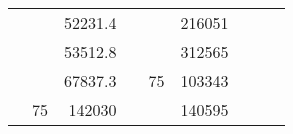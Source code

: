 \begin{table}[]
\begin{tabular}{|ccrccrccc}
\multicolumn{1}{|c|}{\cellcolor[HTML]{FFFFC7}}                                & \multicolumn{1}{c|}{\cellcolor[HTML]{DAE8FC}}                      & \multicolumn{1}{r|}{\cellcolor[HTML]{DAE8FC}52231.4}   & \multicolumn{1}{c|}{\cellcolor[HTML]{FFFFC7}}                                & \multicolumn{1}{c|}{\cellcolor[HTML]{DAE8FC}}                       & \multicolumn{1}{r|}{\cellcolor[HTML]{DDFDFF}216051}    &                                                                              &                                                                    &                                                        \\ \cline{3-3} \cline{6-6}
\multicolumn{1}{|c|}{\cellcolor[HTML]{FFFFC7}}                                & \multicolumn{1}{c|}{\cellcolor[HTML]{DAE8FC}}                      & \multicolumn{1}{r|}{\cellcolor[HTML]{DDFDFF}53512.8}   & \multicolumn{1}{c|}{\cellcolor[HTML]{FFFFC7}}                                & \multicolumn{1}{c|}{\cellcolor[HTML]{DAE8FC}}                       & \multicolumn{1}{r|}{\cellcolor[HTML]{DAE8FC}312565}    &                                                                              &                                                                    &                                                        \\ \cline{3-3} \cline{6-6}
\multicolumn{1}{|c|}{\cellcolor[HTML]{FFFFC7}}                                & \multicolumn{1}{c|}{\cellcolor[HTML]{DAE8FC}}                      & \multicolumn{1}{r|}{\cellcolor[HTML]{DAE8FC}67837.3}   & \multicolumn{1}{c|}{\cellcolor[HTML]{FFFFC7}}                                & \multicolumn{1}{c|}{\multirow{-10}{*}{\cellcolor[HTML]{DAE8FC}75}}  & \multicolumn{1}{r|}{\cellcolor[HTML]{DDFDFF}103343}    &                                                                              &                                                                    &                                                        \\ \cline{3-3} \cline{5-6}
\multicolumn{1}{|c|}{\cellcolor[HTML]{FFFFC7}}                                & \multicolumn{1}{c|}{\multirow{-10}{*}{\cellcolor[HTML]{DAE8FC}75}} & \multicolumn{1}{r|}{\cellcolor[HTML]{DDFDFF}142030}    & \multicolumn{1}{c|}{\cellcolor[HTML]{FFFFC7}}                                & \multicolumn{1}{c|}{\cellcolor[HTML]{DDFDFF}}                       & \multicolumn{1}{r|}{\cellcolor[HTML]{DAE8FC}140595}    &                                                                              &                                                                    &                                                        \\ \cline{2-3} \cline{6-6}

\end{tabular}
\end{table}
